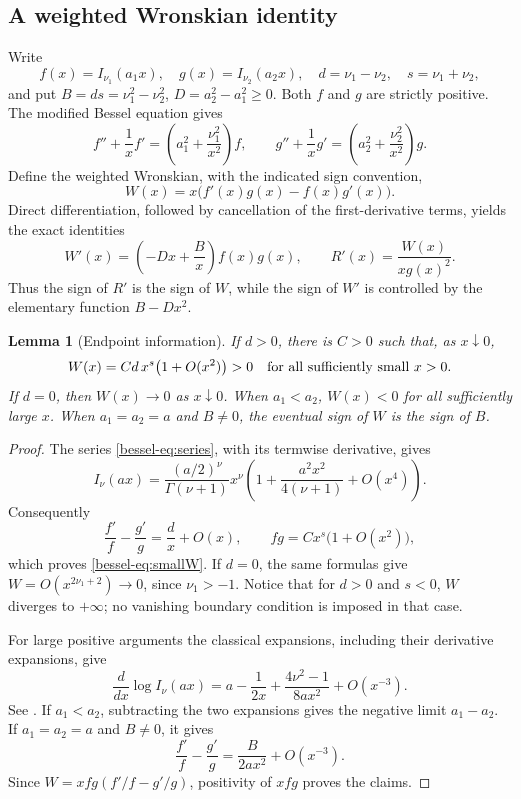 \documentclass[11pt,a4paper]{article}
\newtheorem{lemma}[theorem]{Lemma}
\theoremstyle{remark}\newtheorem{remark}[theorem]{Remark}
\numberwithin{equation}{section}
\begin{document}
\subsection{A weighted Wronskian identity}
Write
\[
 f(x)=I_{\nu_1}(a_1x),\quad g(x)=I_{\nu_2}(a_2x),\quad
 d=\nu_1-\nu_2,\quad s=\nu_1+\nu_2,
\]
and put $B=ds=\nu_1^2-\nu_2^2$, $D=a_2^2-a_1^2\ge0$.
Both $f$ and $g$ are strictly positive. The modified Bessel equation
\cite[Eq.~10.25.1]{bessel-DLMF} gives
\[
 f''+\frac1x f'=\left(a_1^2+\frac{\nu_1^2}{x^2}\right)f,
 \qquad
 g''+\frac1x g'=\left(a_2^2+\frac{\nu_2^2}{x^2}\right)g.
\]
Define the weighted Wronskian, with the indicated sign convention,
\begin{equation}\label{bessel-eq:W}
 W(x)=x\bigl(f'(x)g(x)-f(x)g'(x)\bigr).
\end{equation}
Direct differentiation, followed by cancellation of the first-derivative
terms, yields the exact identities
\begin{equation}\label{bessel-eq:identity}
 \boxed{\quad W'(x)=\left(-Dx+\frac{B}{x}\right)f(x)g(x),
 \qquad R'(x)=\frac{W(x)}{xg(x)^2}.\quad}
\end{equation}
Thus the sign of $R'$ is the sign of $W$, while the sign of $W'$ is
controlled by the elementary function $B-Dx^2$.

\begin{lemma}[Endpoint information]\label{bessel-lem:endpoints}
If $d>0$, there is $C>0$ such that, as $x\downarrow0$,
\begin{equation}\label{bessel-eq:smallW}
 W(x)=Cd\,x^s\bigl(1+O(x^2)\bigr)>0
 \quad\hbox{for all sufficiently small }x>0.
\end{equation}
If $d=0$, then $W(x)\to0$ as $x\downarrow0$.
When $a_1<a_2$, $W(x)<0$ for all sufficiently large $x$.
When $a_1=a_2=a$ and $B\ne0$, the eventual sign of $W$ is the sign
of $B$.
\end{lemma}
\begin{proof}
The series \eqref{bessel-eq:series}, with its termwise derivative, gives
\[
 I_\nu(ax)=\frac{(a/2)^\nu}{\Gamma(\nu+1)}x^\nu
 \left(1+\frac{a^2x^2}{4(\nu+1)}+O(x^4)\right).
\]
Consequently
\[
 \frac{f'}f-\frac{g'}g=\frac d x+O(x),\qquad
 fg=Cx^s\bigl(1+O(x^2)\bigr),
\]
which proves \eqref{bessel-eq:smallW}. If $d=0$, the same formulas give
$W=O(x^{2\nu_1+2})\to0$, since $\nu_1>-1$.
Notice that for $d>0$ and $s<0$, $W$ diverges to $+\infty$;
no vanishing boundary condition is imposed in that case.

For large positive arguments the classical expansions, including
their derivative expansions, give
\begin{equation}\label{bessel-eq:largeLog}
 \frac{d}{dx}\log I_\nu(ax)
 =a-\frac1{2x}+\frac{4\nu^2-1}{8ax^2}+O(x^{-3}).
\end{equation}
See \cite[\S10.40(i), Eqs.~10.40.1 and 10.40.3]{bessel-DLMF}.
If $a_1<a_2$, subtracting the two expansions gives the negative
limit $a_1-a_2$. If $a_1=a_2=a$ and $B\ne0$, it gives
\[
 \frac{f'}f-\frac{g'}g=\frac{B}{2ax^2}+O(x^{-3}).
\]
Since $W=xfg(f'/f-g'/g)$, positivity of $xfg$ proves the claims.
\end{proof}
\end{document}
